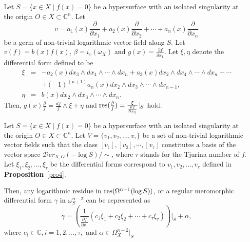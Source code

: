 \documentclass[pdftex]{arxsigma}
\begin{document}
\begin{proposition}\label{pro4}
 Let $S=\{ x \in X \mid f(x)=0 \} $ be a hypersurface with an isolated singularity at the origin $ O \in X \subset {\mathbb C}^n. $ Let 
\begin{equation*}
v=a_1(x)\frac{\partial}{\partial x_1} + a_2(x)\frac{\partial}{\partial x_2}+ \cdots +a_n(x)\frac{\partial}{\partial x_n} 
\end{equation*}
be a germ of  non-trivial logarithmic vector field along $S$. Let $ v(f)=b(x)f(x) $, $ \beta=i_v(\omega_X) $ and $ g(x) =\frac{\partial f}{\partial x_1}. $ Let $ \xi, \eta$ denote the differential form defined to be 
\begin{eqnarray*}
\xi &=& -a_2(x)dx_3 \wedge dx_4 \wedge \cdots \wedge dx_n +a_3(x)dx_2 \wedge dx_4 \wedge \cdots \wedge dx_n - \cdots \\
& & +(-1)^{(n+1)}a_n(x)dx_2 \wedge dx_3 \wedge \cdots \wedge dx_{n-1}, \\
\eta &=& b(x) dx_2 \wedge dx_3 \wedge \cdots \wedge dx_n. 
\end{eqnarray*} 
Then,
$ g(x)\frac{\beta}{f} = \frac{df}{f}\wedge \xi + \eta $
 and $ {\rm res}(\frac{\beta}{f}) = \frac{\xi}{\frac{\partial f}{\partial x_1}}|_S $ hold.
\end{proposition}

\begin{theorem} 
Let $S=\{ x \in X \mid f(x)=0 \} $ be a hypersurface with an isolated singularity at the origin $ O \in X \subset {\mathbb C}^n. $ Let $V=\{v_1, v_2,\ldots , v_{\tau} \} $ be a set of non-trivial logarithmic vector fields such that 
the class $ [v_1], [v_2], \cdots, [v_{\tau}] $ constitutes a basis of the vector space $ {\mathcal Der}_{X,O}(-\log S)/\sim$, where 
$ \tau $ stands for the Tjurina number of $f$. Let $ \xi_1, \xi_2, \ldots, \xi_{\tau} $ be the differential forms correspond to 
$ v_1, v_2, \ldots, v_{\tau} $ defined in {\bf Proposition}~\ref{pro4}. 

Then, any logarithmic residue in ${\rm res}(\Omega^{n-1}(\log S)) $, or a regular meromorphic differential form $ \gamma $ in $ \omega_S^{n-2} $ can be represented as 
\begin{equation*}
\gamma = \left(\frac{1}{\frac{\partial f}{\partial x_1}}(c_1\xi_1+c_2\xi_2+ \cdots +c_{\tau}\xi_{\tau})\right)|_S + \alpha, 
\end{equation*}
where $ c_i \in {\mathbb C}, i=1,2,\dots, \tau, $ and $ \alpha \in \Omega_X^{n-2}|_S $
\end{theorem}
\end{document}
